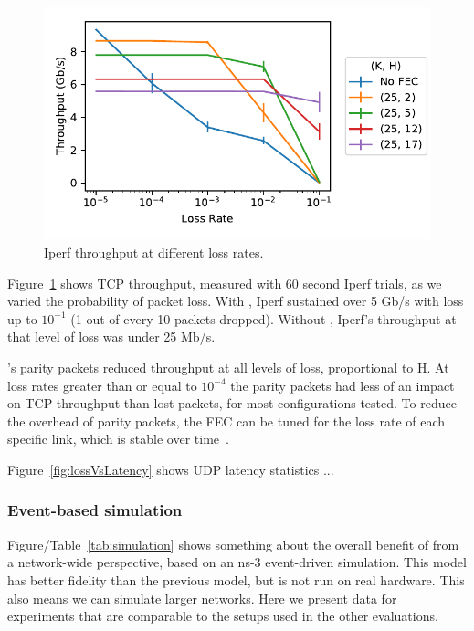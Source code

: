 \begin{figure}
  \centering
  \includegraphics[width=0.3\paperwidth]{figures/lossVsTput.pdf}
  \caption{\label{fig:lossVsTput} Iperf throughput at different loss rates.}
\end{figure}

Figure~\ref{fig:lossVsTput} shows TCP throughput, measured with 60 second Iperf 
trials, as we varied the probability of packet loss. With \OurSys, Iperf sustained 
over 5 Gb/s with loss up to $10^{-1}$ (1 out of every 10 packets dropped). Without 
\OurSys, Iperf's throughput at that level of loss was under 25 Mb/s. 

\OurSys's parity packets reduced throughput at all levels of loss, 
proportional to H. At loss rates greater than or equal to $10^{-4}$ the 
parity packets had less of an impact on TCP throughput than lost packets, for 
most configurations tested. To reduce the overhead of parity packets, the FEC 
can be tuned for the loss rate of each specific link, which is 
stable over time~\cite{corropt}.

Figure~\ref{fig:lossVsLatency} shows UDP latency statistics ...



\subsubsection{Event-based simulation}
Figure/Table~\ref{tab:simulation} shows something about the overall benefit of \OurSys from a network-wide perspective, based on an ns-3 event-driven simulation.
This model has better fidelity than the previous model, but is not run on real hardware. This also means we can simulate larger networks. Here we present data for experiments that are comparable to the setups used in the other evaluations.


